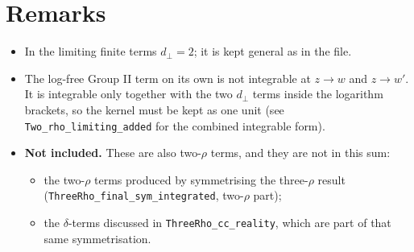 \documentclass[10pt]{article}
\begin{document}
\section{Remarks}
\begin{itemize}
\item In the limiting finite terms $d_{\perp}=2$; it is kept general as in the file.
\item The log-free Group II term on its own is not integrable at $z\to w$ and $z\to w'$. It is integrable only together with the two $d_{\perp}$ terms inside the logarithm brackets, so the kernel must be kept as one unit (see \texttt{Two\_rho\_limiting\_added} for the combined integrable form).
\item \textbf{Not included.} These are also two-$\rho$ terms, and they are not in this sum:
\begin{itemize}
\item the two-$\rho$ terms produced by symmetrising the three-$\rho$ result (\texttt{ThreeRho\_final\_sym\_integrated}, two-$\rho$ part);
\item the $\delta$-terms discussed in \texttt{ThreeRho\_cc\_reality}, which are part of that same symmetrisation.
\end{itemize}
\end{itemize}
\end{document}
